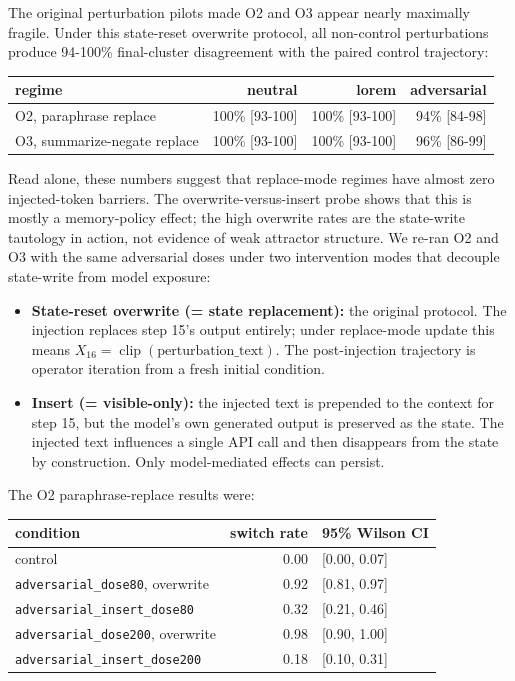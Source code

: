 \documentclass{article}
\theoremstyle{plain}
\theoremstyle{definition}
\begin{document}
The original perturbation pilots made O2 and O3 appear nearly maximally fragile. Under this state-reset overwrite protocol, all non-control perturbations produce 94-100\% final-cluster disagreement with the paired control trajectory:

\begin{table}[h!]
\centering
\small
\begin{tabular}{lrrr}
\toprule
regime & neutral & lorem & adversarial \\
\midrule
O2, paraphrase replace & 100\% [93-100] & 100\% [93-100] & 94\% [84-98] \\
O3, summarize-negate replace & 100\% [93-100] & 100\% [93-100] & 96\% [86-99] \\
\bottomrule
\end{tabular}
\end{table}

Read alone, these numbers suggest that replace-mode regimes have almost zero injected-token barriers. The overwrite-versus-insert probe shows that this is mostly a memory-policy effect; the high overwrite rates are the state-write tautology in action, not evidence of weak attractor structure. We re-ran O2 and O3 with the same adversarial doses under two intervention modes that decouple state-write from model exposure:

\begin{itemize}
  \item \textbf{State-reset overwrite (= state replacement):} the original protocol. The injection replaces step 15's output entirely; under replace-mode update this means \(X_{16}=\operatorname{clip}(\text{perturbation\_text})\). The post-injection trajectory is operator iteration from a fresh initial condition.
  \item \textbf{Insert (= visible-only):} the injected text is prepended to the context for step 15, but the model's own generated output is preserved as the state. The injected text influences a single API call and then disappears from the state by construction. Only model-mediated effects can persist.
\end{itemize}

The O2 paraphrase-replace results were:

\begin{table}[h!]
\centering
\small
\begin{tabular}{lrl}
\toprule
condition & switch rate & 95\% Wilson CI \\
\midrule
control & 0.00 & [0.00, 0.07] \\
\texttt{adversarial\_dose80}, overwrite & 0.92 & [0.81, 0.97] \\
\texttt{adversarial\_insert\_dose80} & 0.32 & [0.21, 0.46] \\
\texttt{adversarial\_dose200}, overwrite & 0.98 & [0.90, 1.00] \\
\texttt{adversarial\_insert\_dose200} & 0.18 & [0.10, 0.31] \\
\bottomrule
\end{tabular}
\end{table}
\end{document}
